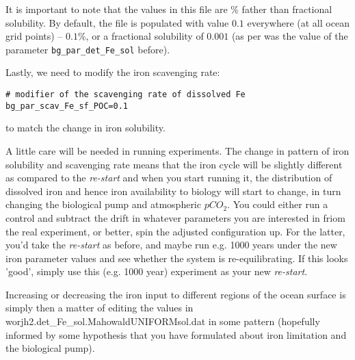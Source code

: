 It is important to note that the values in this file are \% father than fractional solubility. By default, the file is populated with value \(0.1\) everywhere (at all ocean grid points) -- \(0.1\%\), or a fractional solubility of \(0.001\) (as per was the value of the parameter \texttt{\small bg\_par\_det\_Fe\_sol} before).

\vspace{1mm}
Lastly, we need to modify the iron scavenging rate:
\vspace{-1mm}\small\begin{verbatim}
# modifier of the scavenging rate of dissolved Fe
bg_par_scav_Fe_sf_POC=0.1
\end{verbatim}\normalsize\vspace{-1mm}
to match the change in iron solubility.

\vspace{1mm}
A little care will be needed in running experiments. The change in pattern of iron solubility and  scavenging rate means that the iron cycle will be slightly different as compared to the \textit{re-start} and when you start running it, the distribution of dissolved iron and hence iron availability to biology will start to change, in turn changing the biological pump and atmospheric \(pCO_{2}\). You could either run a control and subtract the drift in whatever parameters you are interested in friom the real experiment, or better, spin the adjusted configuration up. For the latter, you'd take the \textit{re-start} as before, and maybe run e.g. 1000 years under the new iron parameter values and see whether the system is re-equilibrating. If this looks 'good', simply use this (e.g. 1000 year) experiment as your new \textit{re-start}.

\vspace{1mm}
Increasing or decreasing the iron input to different regions of the ocean surface is simply then a matter of editing the values in \textsf{\footnotesize worjh2.det\_Fe\_sol.MahowaldUNIFORMsol.dat} in some pattern (hopefully informed by some hypothesis that you have formulated about iron limitation and the biological pump).

